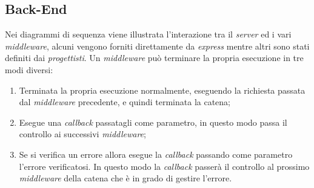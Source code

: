 \subsection{Back-End}
Nei diagrammi di sequenza viene illustrata l'interazione tra il \textit{server} ed i vari \textit{middleware}, alcuni vengono forniti direttamente da \textit{express} mentre altri sono stati definiti dai \textit{progettisti}. Un \textit{middleware} può terminare la propria esecuzione in tre modi diversi:
\begin{enumerate}
	\item Terminata la propria esecuzione normalmente, eseguendo la richiesta passata dal \textit{middleware} precedente, e quindi terminata la catena;
	\item Esegue una \textit{callback} passatagli come parametro, in questo modo passa il controllo ai successivi \textit{middleware};
	\item Se si verifica un errore allora esegue la \textit{callback} passando come parametro l'errore verificatosi. In questo modo la \textit{callback} passerà il controllo al prossimo \textit{middleware} della catena che è in grado di gestire l'errore.
\end{enumerate}